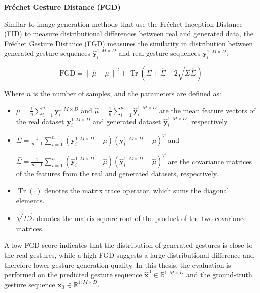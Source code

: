 \textbf{Fréchet Gesture Distance (FGD)}

Similar to image generation methods that use the Fréchet Inception Distance (FID) to measure distributional differences between real and generated data, the Fréchet Gesture Distance (FGD) measures the similarity in distribution between generated gesture sequences $\hat{\mathbf{y}}_i^{1:M \times D}$ and real gesture sequences $\mathbf{y}_i^{1:M \times D}$:

\begin{equation}
	\text{FGD} = \left\| \hat{\mu} - \mu \right\|^2 + \operatorname{Tr}\left( \Sigma + \hat{\Sigma} - 2 \sqrt{\Sigma \hat{\Sigma}} \right)
	\label{eq:fidscore}
\end{equation}

Where $n$ is the number of samples, and the parameters are defined as:

\begin{itemize}
	\item $\mu = \frac{1}{n} \sum_{i=1}^n \mathbf{y}_i^{1:M \times D}$ and $\hat{\mu} = \frac{1}{n} \sum_{i=1}^n \hat{\mathbf{y}}_i^{1:M \times D}$ are the mean feature vectors of the real dataset $\mathbf{y}_i^{1:M \times D}$ and generated dataset $\hat{\mathbf{y}}_i^{1:M \times D}$, respectively.
	 
	\item $\Sigma = \frac{1}{n-1} \sum_{i=1}^n \left( \mathbf{y}_i^{1:M \times D} - \mu \right) \left( \mathbf{y}_i^{1:M \times D} - \mu \right)^T$ and
	
	$\hat{\Sigma} = \frac{1}{n-1} \sum_{i=1}^n \left( \hat{\mathbf{y}}_i^{1:M \times D} - \hat{\mu} \right) \left( \hat{\mathbf{y}}_i^{1:M \times D} - \hat{\mu} \right)^T$ are the covariance matrices of the features from the real and generated datasets, respectively.
	
	\item $\operatorname{Tr}(\cdot)$ denotes the matrix trace operator, which sums the diagonal elements.
	
	\item $\sqrt{\Sigma \hat{\Sigma}}$ denotes the matrix square root of the product of the two covariance matrices.
\end{itemize}

A low FGD score indicates that the distribution of generated gestures is close to the real gestures, while a high FGD suggests a large distributional difference and therefore lower gesture generation quality. In this thesis, the evaluation is performed on the predicted gesture sequence $\hat{\mathbf{x}}^{0} \in \mathbb{R}^{1:M \times D}$ and the ground-truth gesture sequence $\mathbf{x}_{0} \in \mathbb{R}^{1:M \times D}$.

